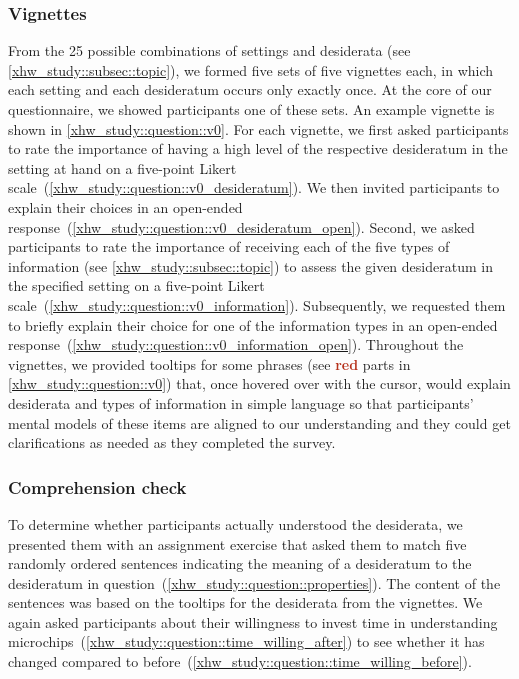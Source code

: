 \subsubsection{Vignettes}
From the 25 possible combinations of settings and desiderata (see \autoref{xhw_study::subsec::topic}), we formed five sets of five vignettes each, in which each setting and each desideratum occurs only exactly once.
At the core of our questionnaire, we showed participants one of these sets.
An example vignette is shown in \autoref{xhw_study::question::v0}.
For each vignette, we first asked participants to rate the importance of having a high level of the respective desideratum in the setting at hand on a five-point Likert scale~(\autoref{xhw_study::question::v0_desideratum}).
We then invited participants to explain their choices in an open-ended response~(\autoref{xhw_study::question::v0_desideratum_open}).
Second, we asked participants to rate the importance of receiving each of the five types of information (see \autoref{xhw_study::subsec::topic}) to assess the given desideratum in the specified setting on a five-point Likert scale~(\autoref{xhw_study::question::v0_information}).
Subsequently, we requested them to briefly explain their choice for one of the information types in an open-ended response~(\autoref{xhw_study::question::v0_information_open}).
Throughout the vignettes, we provided tooltips for some phrases (see \textbf{\textcolor[HTML]{B6321C}{red}} parts in \autoref{xhw_study::question::v0}) that, once hovered over with the cursor, would explain desiderata and types of information in simple language so that participants' mental models of these items are aligned to our understanding and they could get clarifications as needed as they completed the survey.

\subsubsection{Comprehension check}
To determine whether participants actually understood the desiderata, we presented them with an assignment exercise that asked them to match five randomly ordered sentences indicating the meaning of a desideratum to the desideratum in question~(\autoref{xhw_study::question::properties}).
The content of the sentences was based on the tooltips for the desiderata from the vignettes.
We again asked participants about their willingness to invest time in understanding microchips~(\autoref{xhw_study::question::time_willing_after})
to see whether it has changed compared to before~(\autoref{xhw_study::question::time_willing_before}).

